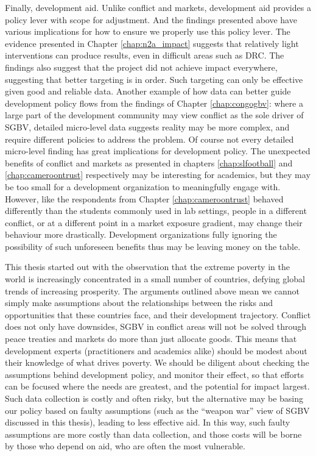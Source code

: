 Finally, development aid. Unlike conflict and markets, development aid provides a policy lever with scope for adjustment. And the findings presented above have various implications for how to ensure we properly use this policy lever. The evidence presented in Chapter \ref{chap:n2a_impact} suggests that relatively light interventions can produce results, even in difficult areas such as DRC. The findings also suggest that the project did not achieve impact everywhere, suggesting that better targeting is in order. Such targeting can only be effective given good and reliable data. Another example of how data can better guide development policy flows from the findings of Chapter \ref{chap:congogbv}: where a large part of the development community may view conflict as the sole driver of SGBV, detailed micro-level data suggests reality may be more complex, and require different policies to address the problem. Of course not every detailed micro-level finding has great implications for development policy. The unexpected benefits of conflict and markets as presented in chapters \ref{chap:slfootball} and \ref{chap:cameroontrust} respectively may be interesting for academics, but they may be too small for a development organization to meaningfully engage with. However, like the respondents from Chapter \ref{chap:cameroontrust} behaved differently than the students commonly used in lab settings, people in a different conflict, or at a different point in a market exposure gradient, may change their behaviour more drastically. Development organizations fully ignoring the possibility of such unforeseen benefits thus may be leaving money on the table.

This thesis started out with the observation that the extreme poverty in the world is increasingly concentrated in a small number of countries, defying global trends of increasing prosperity. The arguments outlined above mean we cannot simply make assumptions about the relationships between the risks and opportunities that these countries face, and their development trajectory. Conflict does not only have downsides, SGBV in conflict areas will not be solved through peace treaties and markets do more than just allocate goods. This means that development experts (practitioners and academics alike) should be modest about their knowledge of what drives poverty. We should be diligent about checking the assumptions behind development policy, and monitor their effect, so that efforts can be focused where the needs are greatest, and the potential for impact largest. Such data collection is costly and often risky, but the alternative may be basing our policy based on faulty assumptions (such as the ``weapon war'' view of SGBV discussed in this thesis), leading to less effective aid. In this way, such faulty assumptions are more costly than data collection, and those costs will be borne by those who depend on aid, who are often the most vulnerable. 


